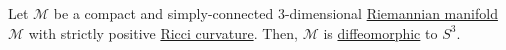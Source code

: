 \begin{theorem}[Hamilton]\label{thm:Hamilton}
	Let \(\mathcal{M} \) be a compact and simply-connected \(3\)-dimensional \hyperref[def:Riemannian-manifold]{Riemannian manifold} \(\mathcal{M} \) with strictly positive \hyperref[def:Ricci-curvature]{Ricci curvature}. Then, \(\mathcal{M} \) is \hyperref[def:diffeomorphic]{diffeomorphic} to \(S^3\).
\end{theorem}